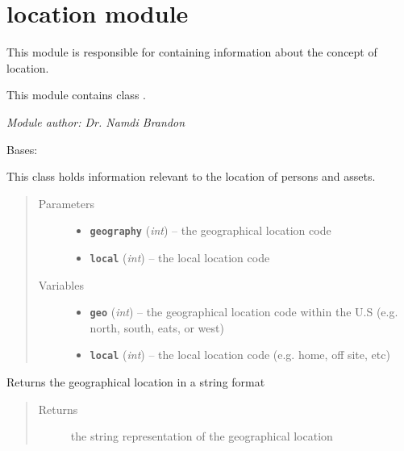 \documentclass[letterpaper,10pt,english]{sphinxmanual}
\begin{document}
\section{location module}
\label{location::doc}\label{location:module-location}\label{location:location-module}
This module is responsible for containing information about the concept of location.

This module contains class {\hyperref[location:location.Location]{\emph{}}}.

\emph{Module author: Dr. Namdi Brandon}

\begin{fulllineitems}
\label{location:location.Location}
Bases: 

This class holds information relevant to the location of persons and assets.
\begin{quote}\begin{description}
\item[{Parameters}] \leavevmode\begin{itemize}
\item {} 
\textbf{\texttt{geography}} (\emph{int}) -- the geographical location code

\item {} 
\textbf{\texttt{local}} (\emph{int}) -- the local location code

\end{itemize}

\item[{Variables}] \leavevmode\begin{itemize}
\item {} 
\textbf{\texttt{geo}} (\emph{int}) -- the geographical location code within the U.S (e.g. north, south, eats, or west)

\item {} 
\textbf{\texttt{local}} (\emph{int}) -- the local location code (e.g. home, off site, etc)

\end{itemize}

\end{description}\end{quote}

\begin{fulllineitems}
\label{location:location.Location.print_geo}
Returns the geographical location in a string format
\begin{quote}\begin{description}
\item[{Returns}] \leavevmode
the string representation of the geographical location


\end{description}
\end{quote}
\end{fulllineitems}
\end{fulllineitems}
\end{document}

